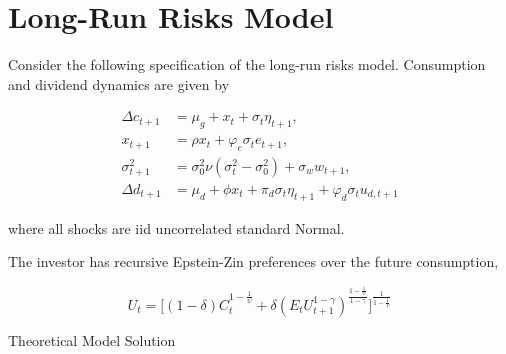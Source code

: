 \documentclass{article}
\begin{document}
\pagebreak

\section{Long-Run Risks Model}

Consider the following specification of the long-run risks model. Consumption and dividend dynamics are given by

\begin{align*}
\Delta c_{t+1} &= \mu_g + x_t + \sigma_t \eta_{t+1}, \\
x_{t+1} &= \rho x_t + \varphi_e \sigma_t e_{t+1}, \\
\sigma_{t+1}^2 &= \sigma_0^2 \nu(\sigma_t^2 - \sigma_0^2) + \sigma_w w_{t+1},\\
\Delta d_{t+1} &= \mu_d + \phi x_t + \pi_d \sigma_t \eta_{t+1} + \varphi_d \sigma_t u_{d,t+1}
\end{align*}

where all shocks are iid uncorrelated standard Normal.

\bigskip

The investor has recursive Epstein-Zin preferences over the future consumption,

$$
U_t = \Bigg[(1-\delta)C_t^{1- \frac{1}{\psi}} + \delta (E_t U_{t+1}^{1 - \gamma})^{\frac{1-\frac{1}{\psi}}{1 - \gamma}} \Bigg]^{\frac{1}{1-\frac{1}{\psi}}}
$$

Theoretical Model Solution
\end{document}
